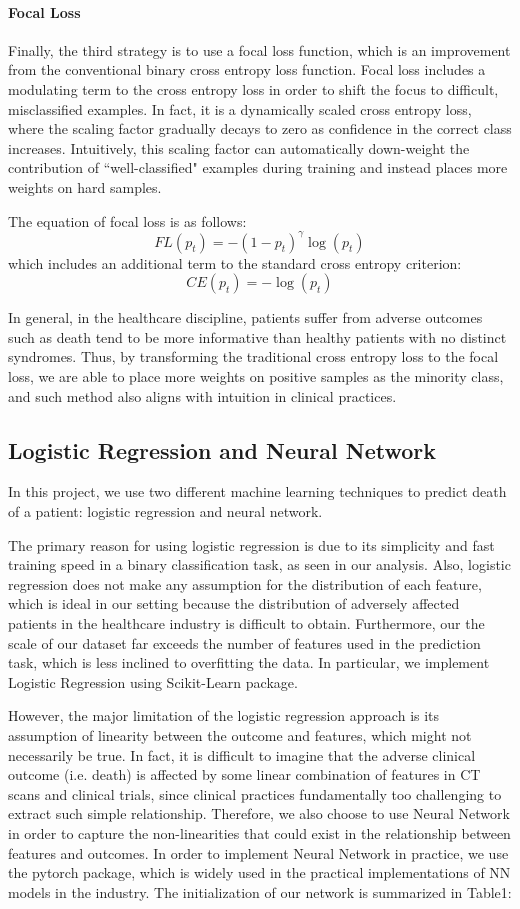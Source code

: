 \documentclass{article}
\begin{document}
\paragraph{Focal Loss}
Finally, the third strategy is to use a focal loss function, which is an improvement from the conventional binary cross entropy loss function. Focal loss includes a modulating term to the cross entropy loss in order to shift the focus to difficult, misclassified examples. In fact, it is a dynamically scaled cross entropy loss, where the scaling factor gradually decays to zero as confidence in the correct class increases. Intuitively, this scaling factor can automatically down-weight the contribution of ``well-classified" examples during training and instead places more weights on hard samples.

The equation of focal loss is as follows:
$$
FL(p_t)= - (1-p_t)^\gamma \log(p_t)
$$
which includes an additional term to the standard cross entropy criterion: 
$$
CE(p_t) = -\log(p_t)
$$

In general, in the healthcare discipline, patients suffer from adverse outcomes such as death tend to be more informative than healthy patients with no distinct syndromes. Thus, by transforming the traditional cross entropy loss to the focal loss, we are able to place more weights on positive samples as the minority class, and such method also aligns with intuition in clinical practices.

\subsection{Logistic Regression and Neural Network}
In this project, we use two different machine learning techniques to predict death of a patient: logistic regression and neural network. 

The primary reason for using logistic regression is due to its simplicity and fast training speed in a binary classification task, as seen in our analysis. Also, logistic regression does not make any assumption for the distribution of each feature, which is ideal in our setting because the distribution of adversely affected patients in the healthcare industry is difficult to obtain. Furthermore, our the scale of our dataset far exceeds the number of features used in the prediction task, which is less inclined to overfitting the data. In particular, we implement Logistic Regression using Scikit-Learn package. 

However, the major limitation of the logistic regression approach is its assumption of linearity between the outcome and features, which might not necessarily be true. In fact, it is difficult to imagine that the adverse clinical outcome (i.e. death) is affected by some linear combination of features in CT scans and clinical trials, since clinical practices fundamentally too challenging to extract such simple relationship. Therefore, we also choose to use Neural Network in order to capture the non-linearities that could exist in the relationship between features and outcomes. In order to implement Neural Network in practice, we use the pytorch package, which is widely used in the practical implementations of NN models in the industry. The initialization of our network is summarized in Table1:
\end{document}
